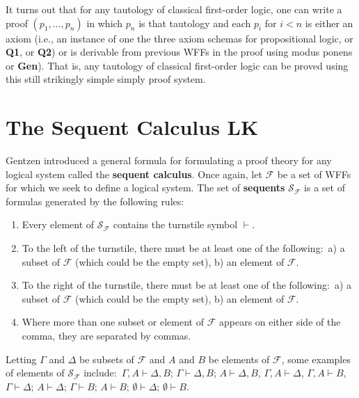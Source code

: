 \documentclass[11pt]{article}
\theoremstyle{definition}
\theoremstyle{remark}
\begin{document}
It turns out that for any tautology of classical first-order logic, one can write a proof $(p_{1},\dots,p_{n})$ in which $p_{n}$ is that tautology and each $p_{i}$ for $i<n$ is either an axiom (i.e., an instance of one the three axiom schemas for propositional logic, or \textbf{Q1}, or \textbf{Q2}) or is derivable from previous WFFs in the proof using modus ponens or \textbf{Gen}). That is, any tautology of classical first-order logic can be proved using this still strikingly simple simply proof system.

\section{The Sequent Calculus LK}
Gentzen introduced a general formula for formulating a proof theory for any logical system called the \textbf{sequent calculus}. Once again, let $\mathcal{F}$ be a set of WFFs for which we seek to define a logical system. The set of \textbf{sequents} $\mathcal{S}_{\mathcal{F}}$ is a set of formulas generated by the following rules:
\begin{enumerate}
    \item Every element of $\mathcal{S}_{\mathcal{F}}$ contains the turnstile symbol $\vdash$. 

    \item To the left of the turnstile, there must be at least one of the following:\ a) a subset of $\mathcal{F}$ (which could be the empty set), b) an element of $\mathcal{F}$. 

    \item To the right of the turnstile, there must be at least one of the following:\ a) a subset of $\mathcal{F}$ (which could be the empty set), b) an element of $\mathcal{F}$. 

    \item Where more than one subset or element of $\mathcal{F}$ appears on either side of the comma, they are separated by commas. 
\end{enumerate}
Letting $\Gamma$ and $\Delta$ be subsets of $\mathcal{F}$ and $A$ and $B$ be elements of $\mathcal{F}$, some examples of elements of $\mathcal{S}_{\mathcal{F}}$ include:\ $\Gamma,A\vdash\Delta,B$; $\Gamma\vdash\Delta,B$; $A\vdash\Delta,B$, $\Gamma,A\vdash\Delta$, $\Gamma,A\vdash B$, $\Gamma\vdash\Delta$; $A\vdash\Delta$; $\Gamma\vdash B$; $A\vdash B$; $\emptyset\vdash\Delta$; $\emptyset\vdash B$.\par 
\end{document}
